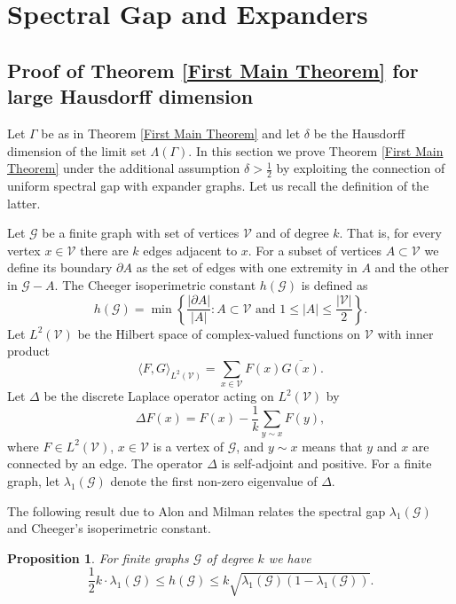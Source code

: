 \documentclass[12pt]{article}
\newtheorem{prop}[thm]{Proposition}
\begin{document}
\section{Spectral Gap and Expanders}\label{Expanders}

\subsection{Proof of Theorem \ref{First Main Theorem} for large Hausdorff dimension}

Let $ \Gamma $ be as in Theorem \ref{First Main Theorem} and let $ \delta $ be the Hausdorff dimension of the limit set $ \Lambda(\Gamma) $. In this section we prove Theorem \ref{First Main Theorem} under the additional assumption $ \delta > \frac{1}{2} $ by exploiting the connection of uniform spectral gap with expander graphs. Let us recall the definition of the latter.

Let $ \mathcal{G} $ be a finite graph with set of vertices $ \mathcal{V} $ and of degree $ k $. That is, for every vertex $ x\in \mathcal{V} $ there are $ k $ edges adjacent to $ x $. For a subset of vertices $ A\subset \mathcal{V} $ we define its boundary $ \partial A $ as the set of edges with one extremity in $ A $ and the other in $ \mathcal{G}-A. $ The Cheeger isoperimetric constant $ h(\mathcal{G}) $ is defined as
$$ h(\mathcal{G}) = \min \left\{  \frac{\vert \partial A \vert}{\vert A\vert} : A\subset \mathcal{V} \text{ and } 1 \leq \vert A\vert \leq \frac{\vert \mathcal{V}\vert}{2}\right\}. $$
Let $ L^{2}(\mathcal{V}) $ be the Hilbert space of complex-valued functions on $ \mathcal{V} $ with inner product
$$ \langle F, G \rangle_{L^{2}(\mathcal{V})} = \sum_{x\in \mathcal{V}} F(x) \overline{G(x)}. $$
Let $ \Delta $ be the discrete Laplace operator acting on $ L^{2}(\mathcal{V}) $ by
$$ \Delta F(x) = F(x) - \frac{1}{k}\sum_{y\sim x} F(y), $$
where $ F\in L^{2}(\mathcal{V}) $, $ x\in \mathcal{V} $ is a vertex of $ \mathcal{G} $, and $ y\sim x $ means that $ y $ and $ x $ are connected by an edge. The operator $ \Delta $ is self-adjoint and positive. For a finite graph, let $ \lambda_{1}(\mathcal{G}) $ denote the first non-zero eigenvalue of $ \Delta. $ 

The following result due to Alon and Milman \cite{AlonMilman} relates the spectral gap $ \lambda_{1}(\mathcal{G}) $ and Cheeger's isoperimetric constant.

\begin{prop}\label{Spectral Gap and Cheeger}
For finite graphs $ \mathcal{G} $ of degree $ k $ we have
\begin{equation}\label{inequality}
\frac{1}{2}k\cdot \lambda_{1}(\mathcal{G}) \leq h(\mathcal{G}) \leq k \sqrt{\lambda_{1}(\mathcal{G})(1-\lambda_{1}(\mathcal{G}))}.
\end{equation}
\end{prop}
\end{document}

